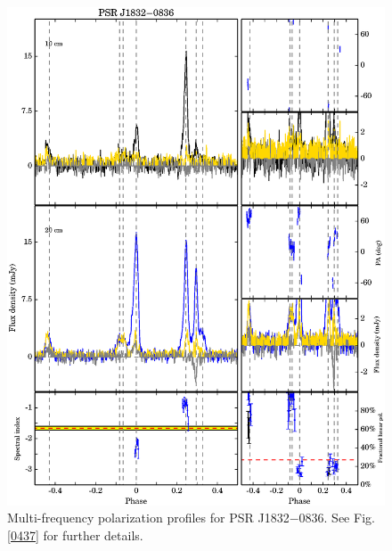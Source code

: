 \documentclass[useAMS,usenatbib]{mn2e}
\begin{document}
\begin{appendix}
\begin{figure}
\begin{center}
\includegraphics[width=6 in]{1832.ps}
\caption{Multi-frequency polarization profiles for PSR J1832$-$0836. 
See Fig. \ref{0437} for further details.}
\label{1832}
\end{center}
\end{figure}


\end{appendix}
\end{document}
